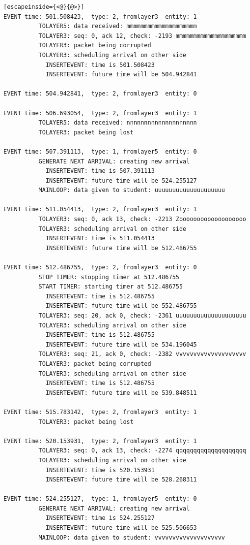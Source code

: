 \documentclass[paper=a4, fontsize=11pt]{scrartcl}
\numberwithin{equation}{section}		%
\numberwithin{figure}{section}			%
\numberwithin{table}{section}				%
\begin{document}
\begin{lstlisting}[escapeinside={<@}{@>}]
EVENT time: 501.508423,  type: 2, fromlayer3  entity: 1
          TOLAYER5: data received: mmmmmmmmmmmmmmmmmmmm
          TOLAYER3: seq: 0, ack 12, check: -2193 mmmmmmmmmmmmmmmmmmmm
          TOLAYER3: packet being corrupted
          TOLAYER3: scheduling arrival on other side
            INSERTEVENT: time is 501.508423
            INSERTEVENT: future time will be 504.942841

EVENT time: 504.942841,  type: 2, fromlayer3  entity: 0

EVENT time: 506.693054,  type: 2, fromlayer3  entity: 1
          TOLAYER5: data received: nnnnnnnnnnnnnnnnnnnn
          TOLAYER3: packet being lost

EVENT time: 507.391113,  type: 1, fromlayer5  entity: 0
          GENERATE NEXT ARRIVAL: creating new arrival
            INSERTEVENT: time is 507.391113
            INSERTEVENT: future time will be 524.255127
          MAINLOOP: data given to student: uuuuuuuuuuuuuuuuuuuu

EVENT time: 511.054413,  type: 2, fromlayer3  entity: 1
          TOLAYER3: seq: 0, ack 13, check: -2213 Zooooooooooooooooooo
          TOLAYER3: scheduling arrival on other side
            INSERTEVENT: time is 511.054413
            INSERTEVENT: future time will be 512.486755

EVENT time: 512.486755,  type: 2, fromlayer3  entity: 0
          STOP TIMER: stopping timer at 512.486755
          START TIMER: starting timer at 512.486755
            INSERTEVENT: time is 512.486755
            INSERTEVENT: future time will be 552.486755
          TOLAYER3: seq: 20, ack 0, check: -2361 uuuuuuuuuuuuuuuuuuuu
          TOLAYER3: scheduling arrival on other side
            INSERTEVENT: time is 512.486755
            INSERTEVENT: future time will be 534.196045
          TOLAYER3: seq: 21, ack 0, check: -2382 vvvvvvvvvvvvvvvvvvvv
          TOLAYER3: packet being corrupted
          TOLAYER3: scheduling arrival on other side
            INSERTEVENT: time is 512.486755
            INSERTEVENT: future time will be 539.848511

EVENT time: 515.783142,  type: 2, fromlayer3  entity: 1
          TOLAYER3: packet being lost

EVENT time: 520.153931,  type: 2, fromlayer3  entity: 1
          TOLAYER3: seq: 0, ack 13, check: -2274 qqqqqqqqqqqqqqqqqqqq
          TOLAYER3: scheduling arrival on other side
            INSERTEVENT: time is 520.153931
            INSERTEVENT: future time will be 528.268311

EVENT time: 524.255127,  type: 1, fromlayer5  entity: 0
          GENERATE NEXT ARRIVAL: creating new arrival
            INSERTEVENT: time is 524.255127
            INSERTEVENT: future time will be 525.506653
          MAINLOOP: data given to student: vvvvvvvvvvvvvvvvvvvv


\end{lstlisting}
\end{document}

